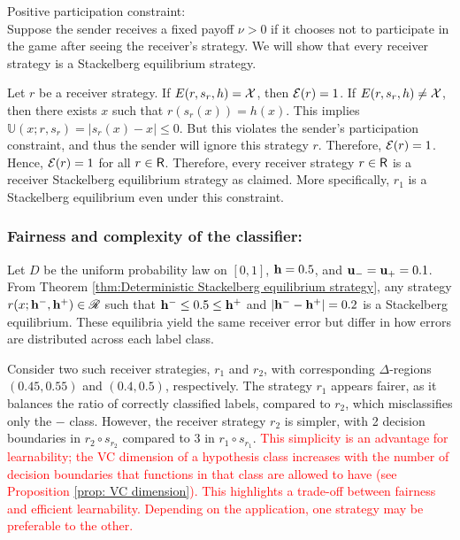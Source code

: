 \begin{case}{Positive participation constraint:} \\
Suppose the sender receives a fixed payoff $\nu > 0$ if it chooses not to participate in the game after seeing the receiver's strategy. We will show that every receiver strategy is a Stackelberg equilibrium strategy.

Let $r$ be a receiver strategy. If $E(r, s_r, h) = \mathcal{X}$, then $\mathcal{E}(r) = 1$. If $E(r, s_r, h) \neq \mathcal{X}$, then there exists $x$ such that $r(s_r(x)) = h(x)$. This implies $\mathbb{U}(x; r, s_r) = |s_r(x) - x| \leq 0$. But this violates the sender's participation constraint, and thus the sender will ignore this strategy $r$. Therefore, $\mathcal{E}(r) = 1$. Hence, $\mathcal{E}(r) = 1$ for all $r \in \mathsf{R}$. Therefore, every receiver strategy $r \in \mathsf{R}$ is a receiver Stackelberg equilibrium strategy as claimed. More specifically, $r_1$ is a Stackelberg equilibrium even under this constraint.
\end{case}


\subsubsection{Fairness and complexity of the classifier:}
Let $D$ be the uniform probability law on $[0,1]$, $\mathbf{h} = 0.5$, and $\mathbf{u_-} = \mathbf{u_+} = 0.1$. From Theorem \ref{thm:Deterministic Stackelberg equilibrium strategy}, any strategy $r(x; \mathbf{h^{-}}, \mathbf{h^{+}}) \in \mathscr{R}$ such that $\mathbf{h^{-}} \leq 0.5 \leq \mathbf{h^{+}}$ and $|\mathbf{h^{-}} - \mathbf{h^{+}}| = 0.2$ is a Stackelberg equilibrium. These equilibria yield the same receiver error but differ in how errors are distributed across each label class.

Consider two such receiver strategies, $r_1$ and $r_2$, with 
corresponding $\Delta$-regions $(0.45, 0.55)$ and $(0.4, 0.5)$, 
respectively. The strategy $r_1$ appears fairer, as it balances 
the ratio of correctly classified labels, compared to $r_2$, 
which misclassifies only the $-$ class. However, the receiver 
strategy $r_2$ is simpler, with 2 decision boundaries in 
$r_2 \circ s_{r_2}$ compared to 3 in $r_1 \circ s_{r_1}$. 
\textcolor{red}{This simplicity is an advantage for learnability; 
the VC dimension of a hypothesis class increases with the number of decision 
boundaries that functions in that class are allowed to have
(see Proposition \ref{prop: VC dimension}). This 
highlights a trade-off between fairness and 
efficient learnability. Depending on the 
application, one strategy may be preferable to the other.}

